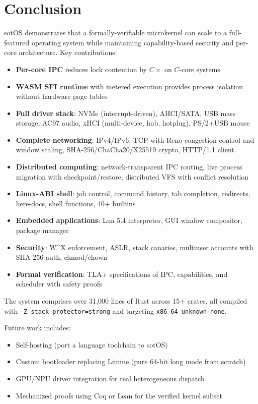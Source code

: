 \documentclass[11pt,letterpaper]{article}
\theoremstyle{definition}
\begin{document}
\section{Conclusion}

sotOS demonstrates that a formally-verifiable microkernel can scale to a
full-featured operating system while maintaining capability-based security and
per-core architecture. Key contributions:

\begin{itemize}[nosep]
    \item \textbf{Per-core IPC} reduces lock contention by $C\times$ on $C$-core systems
    \item \textbf{WASM SFI runtime} with metered execution provides process isolation without hardware page tables
    \item \textbf{Full driver stack}: NVMe (interrupt-driven), AHCI/SATA, USB mass storage, AC97 audio, xHCI (multi-device, hub, hotplug), PS/2+USB mouse
    \item \textbf{Complete networking}: IPv4/IPv6, TCP with Reno congestion control and window scaling, SHA-256/ChaCha20/X25519 crypto, HTTP/1.1 client
    \item \textbf{Distributed computing}: network-transparent IPC routing, live process migration with checkpoint/restore, distributed VFS with conflict resolution
    \item \textbf{Linux-ABI shell}: job control, command history, tab completion, redirects, here-docs, shell functions, 40+ builtins
    \item \textbf{Embedded applications}: Lua 5.4 interpreter, GUI window compositor, package manager
    \item \textbf{Security}: W\^{}X enforcement, ASLR, stack canaries, multiuser accounts with SHA-256 auth, chmod/chown
    \item \textbf{Formal verification}: TLA+ specifications of IPC, capabilities, and scheduler with safety proofs
\end{itemize}

The system comprises over 31,000 lines of Rust across 15+ crates, all compiled with
\texttt{-Z stack-protector=strong} and targeting \texttt{x86\_64-unknown-none}.

Future work includes:
\begin{itemize}[nosep]
    \item Self-hosting (port a language toolchain to sotOS)
    \item Custom bootloader replacing Limine (pure 64-bit long mode from scratch)
    \item GPU/NPU driver integration for real heterogeneous dispatch
    \item Mechanized proofs using Coq or Lean for the verified kernel subset
\end{itemize}
\end{document}
